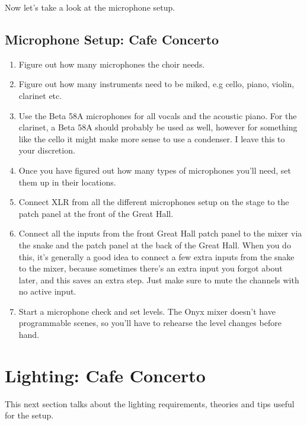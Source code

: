 \documentclass[11pt,a4paper]{book}
\begin{document}
Now let's take a look at the microphone setup.

\subsection{Microphone Setup: Cafe Concerto}

\begin{enumerate}
\item Figure out how many microphones the choir needs.
\item Figure out how many instruments need to be miked, e.g cello, piano, violin, clarinet etc.
\item Use the Beta 58A microphones for all vocals and the acoustic piano. For the clarinet, a Beta 58A should probably be used as well, however for something like the cello it might make more sense to use a condenser. I leave this to your discretion.
\item Once you have figured out how many types of microphones you'll need, set them up in their locations.
\item Connect XLR from all the different microphones setup on the stage to the patch panel at the front of the Great Hall.
\item Connect all the inputs from the front Great Hall patch panel to the mixer via the snake and the patch panel at the back of the Great Hall. When you do this, it's generally a good idea to connect a few extra inputs from the snake to the mixer, because sometimes there's an extra input you forgot about later, and this saves an extra step. Just make sure to mute the channels with no active input.
\item Start a microphone check and set levels. The Onyx mixer doesn't have programmable scenes, so you'll have to rehearse the level changes before hand.
\end{enumerate}
\section{Lighting: Cafe Concerto}
This next section talks about the lighting requirements, theories and tips useful for the setup.
\end{document}
